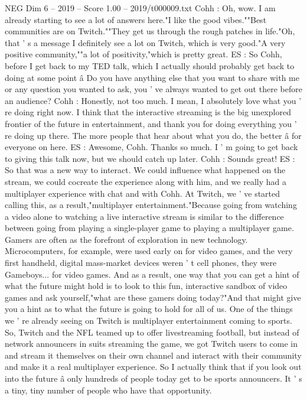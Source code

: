 \begin{textsample}{NEG Dim 6 – 2019 – Score 1.00 – 2019/t000009.txt}
Cohh : Oh, wow.
I am already starting to see a lot of answers here."I like the good vibes.""Best communities are on Twitch.""They get us through the rough patches in life."Oh, that ' s a message I definitely see a lot on Twitch, which is very good."A very positive community,""a lot of positivity,"which is pretty great.
ES : So Cohh, before I get back to my TED talk, which I actually should probably get back to doing at some point â Do you have anything else that you want to share with me or any question you wanted to ask, you ' ve always wanted to get out there before an audience?
Cohh : Honestly, not too much.
I mean, I absolutely love what you ' re doing right now.
I think that the interactive streaming is the big unexplored frontier of the future in entertainment, and thank you for doing everything you ' re doing up there.
The more people that hear about what you do, the better â for everyone on here.
ES : Awesome, Cohh.
Thanks so much.
I ' m going to get back to giving this talk now, but we should catch up later.
Cohh : Sounds great!
ES : So that was a new way to interact.
We could influence what happened on the stream, we could cocreate the experience along with him, and we really had a multiplayer experience with chat and with Cohh.
At Twitch, we ' ve started calling this, as a result,"multiplayer entertainment."Because going from watching a video alone to watching a live interactive stream is similar to the difference between going from playing a single-player game to playing a multiplayer game.
Gamers are often as the forefront of exploration in new technology.
Microcomputers, for example, were used early on for video games, and the very first handheld, digital mass-market devices weren ' t cell phones, they were Gameboys... for video games.
And as a result, one way that you can get a hint of what the future might hold is to look to this fun, interactive sandbox of video games and ask yourself,"what are these gamers doing today?"And that might give you a hint as to what the future is going to hold for all of us.
One of the things we ' re already seeing on Twitch is multiplayer entertainment coming to sports.
So, Twitch and the NFL teamed up to offer livestreaming football, but instead of network announcers in suits streaming the game, we got Twitch users to come in and stream it themselves on their own channel and interact with their community and make it a real multiplayer experience.
So I actually think that if you look out into the future â only hundreds of people today get to be sports announcers.
It ' s a tiny, tiny number of people who have that opportunity.

\end{textsample}
